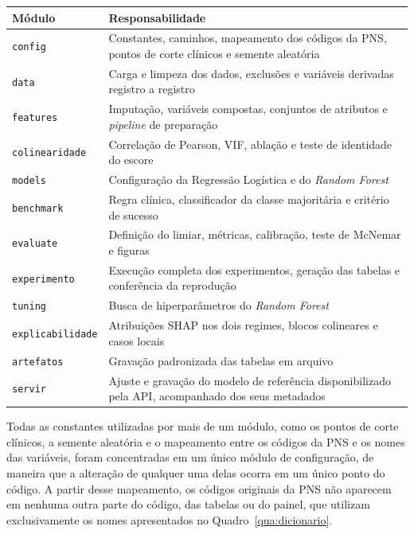 \begin{quadro}[htb]
  \caption{\label{qua:modulos}Módulos do diretório \texttt{src} e suas responsabilidades.}
  \small
  \begin{tabular}{|p{3.4cm}|p{11.0cm}|}
    \hline
    \textbf{Módulo} & \textbf{Responsabilidade} \\ \hline
    \texttt{config} & Constantes, caminhos, mapeamento dos códigos da PNS, pontos de corte clínicos e semente aleatória \\ \hline
    \texttt{data} & Carga e limpeza dos dados, exclusões e variáveis derivadas registro a registro \\ \hline
    \texttt{features} & Imputação, variáveis compostas, conjuntos de atributos e \textit{pipeline} de preparação \\ \hline
    \texttt{colinearidade} & Correlação de Pearson, VIF, ablação e teste de identidade do escore \\ \hline
    \texttt{models} & Configuração da Regressão Logística e do \textit{Random Forest} \\ \hline
    \texttt{benchmark} & Regra clínica, classificador da classe majoritária e critério de sucesso \\ \hline
    \texttt{evaluate} & Definição do limiar, métricas, calibração, teste de McNemar e figuras \\ \hline
    \texttt{experimento} & Execução completa dos experimentos, geração das tabelas e conferência da reprodução \\ \hline
    \texttt{tuning} & Busca de hiperparâmetros do \textit{Random Forest} \\ \hline
    \texttt{explicabilidade} & Atribuições SHAP nos dois regimes, blocos colineares e casos locais \\ \hline
    \texttt{artefatos} & Gravação padronizada das tabelas em arquivo \\ \hline
    \texttt{servir} & Ajuste e gravação do modelo de referência disponibilizado pela API, acompanhado dos seus metadados \\ \hline
  \end{tabular}
\end{quadro}

Todas as constantes utilizadas por mais de um módulo, como os pontos de corte clínicos, a semente aleatória e o mapeamento entre os códigos da PNS e os nomes das variáveis, foram concentradas em um único módulo de configuração, de maneira que a alteração de qualquer uma delas ocorra em um único ponto do código. A partir desse mapeamento, os códigos originais da PNS não aparecem em nenhuma outra parte do código, das tabelas ou do painel, que utilizam exclusivamente os nomes apresentados no Quadro~\ref{qua:dicionario}.

